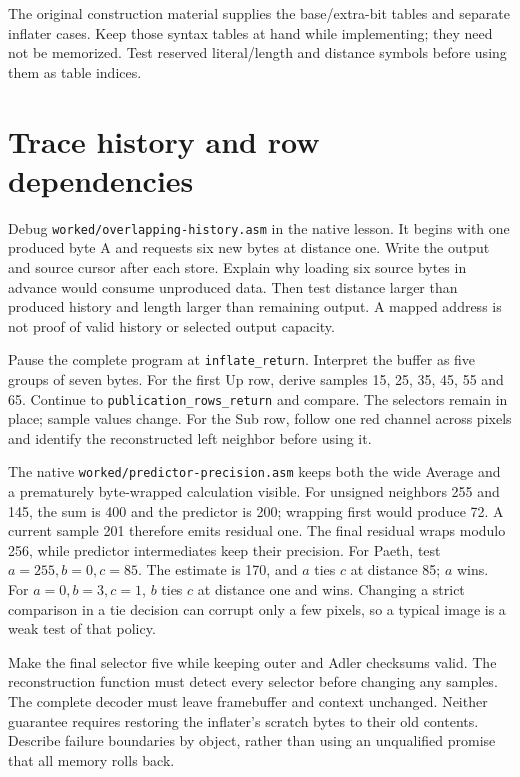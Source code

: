 The original construction material supplies the base/extra-bit tables and
separate inflater cases. Keep those syntax tables at hand while implementing;
they need not be memorized. Test reserved literal/length and distance symbols
before using them as table indices.

\section{Trace history and row dependencies}

Debug \texttt{worked/overlapping-history.asm} in the native lesson. It begins
with one produced byte A and requests six new bytes at distance one.
Write the output and source cursor after each store. Explain why loading six
source bytes in advance would consume unproduced data. Then test distance
larger than produced history and length larger than remaining output. A mapped
address is not proof of valid history or selected output capacity.

Pause the complete program at \texttt{inflate\_return}. Interpret the buffer
as five groups of seven bytes. For the first Up row, derive samples 15, 25, 35,
45, 55 and 65. Continue to \texttt{publication\_rows\_return} and compare.
The selectors remain in place; sample values change. For the Sub row, follow
one red channel across pixels and identify the reconstructed left neighbor
before using it.

The native \texttt{worked/predictor-precision.asm} keeps both the wide Average
and a prematurely byte-wrapped calculation visible. For unsigned neighbors
255 and 145, the sum is 400 and the predictor is 200; wrapping first would
produce 72. A current sample 201 therefore emits residual one. The final
residual wraps modulo 256, while predictor intermediates keep their precision.
For Paeth, test $a=255,b=0,c=85$. The estimate is 170, and $a$ ties $c$ at
distance 85; $a$ wins. For $a=0,b=3,c=1$, $b$ ties $c$ at distance one and
wins. Changing a strict comparison in a tie decision can corrupt only a few
pixels, so a typical image is a weak test of that policy.

Make the final selector five while keeping outer and Adler checksums valid.
The reconstruction function must detect every selector before changing any
samples. The complete decoder must leave framebuffer and context unchanged.
Neither guarantee requires restoring the inflater's scratch bytes to their
old contents. Describe failure boundaries by object, rather than using an
unqualified promise that all memory rolls back.

